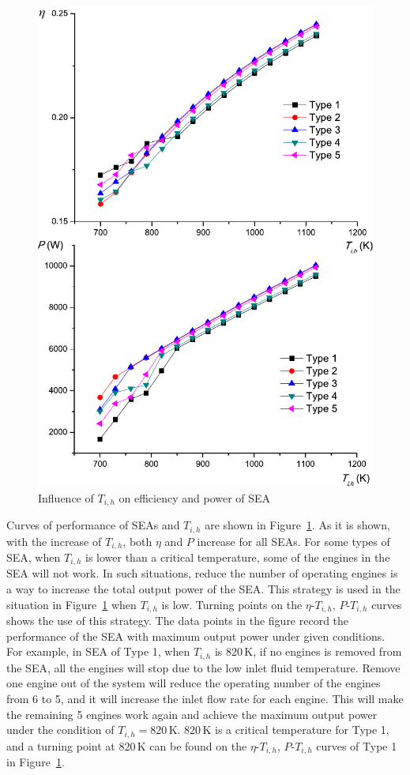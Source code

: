 \noindent \begin{figure}[htbp]
\begin{center}
	\includegraphics[width = 0.7\columnwidth]{fig/T_ih}
	\caption{Influence of $T_{i,h}$ on efficiency and power of SEA}
	\label{fig:Ti_h}
\end{center}
\end{figure}

Curves of performance of SEAs and $T_{i,h}$ are shown in Figure~\ref{fig:Ti_h}.
As it is shown, with the increase of $T_{i,h}$, both $\eta$ and $P$ increase for all SEAs. For some types of SEA, when $T_{i,h}$ is lower than a critical temperature, some of the engines in the SEA will not work. In such situations, reduce the number of operating engines is a way to increase the total output power of the SEA. This strategy is used in the situation in Figure~\ref{fig:Ti_h} when $T_{i,h}$ is low. Turning points on the $\eta$-$T_{i,h}$, $P$-$T_{i,h}$ curves shows the use of this strategy. The data points in the figure record the performance of the SEA with maximum output power under given conditions. 
For example, in SEA of Type 1, when $T_{i,h}$ is  820\,K, if no engines is removed from the SEA, all the engines will stop due to the low inlet fluid temperature. Remove one engine out of the system will reduce the operating number of the engines from 6 to 5, and it will increase the inlet flow rate for each engine. This will make the remaining 5 engines work again and achieve the maximum output power under the condition of $T_{i,h} = 820\,\mathrm{K}$. $820\,\mathrm{K}$ is a critical temperature for Type 1, and a turning point at 820\,K can be found on the $\eta$-$T_{i,h}$, $P$-$T_{i,h}$ curves of Type 1 in Figure~\ref{fig:Ti_h}. 


